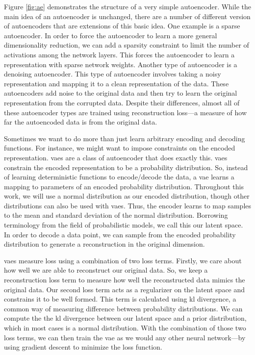 Figure \ref{fig:ae} demonstrates the structure of a very simple autoencoder.
While the main idea of an autoencoder is unchanged, there are a number of different version of autoencoders that are extensions of this basic idea.
One example is a sparse autoencoder.
In order to force the autoencoder to learn a more general dimensionality reduction, we can add a sparsity constraint to limit the number of activations among the network layers.
This forces the autoencoder to learn a representation with sparse network weights.
Another type of autoencoder is a denoising autoencoder.
This type of autoencoder involves taking a noisy representation and mapping it to a clean representation of the data.
These autoencoders add noise to the original data and then try to learn the original representation from the corrupted data.
Despite their differences, almost all of these autoencoder types are trained using reconstruction loss---a measure of how far the autoencoded data is from the original data.

Sometimes we want to do more than just learn arbitrary encoding and decoding functions.
For instance, we might want to impose constraints on the encoded representation.
\glspl{vae} are a class of autoencoder that does exactly this.
\glspl{vae} constrain the encoded representation to be a probability distribution.
So, instead of learning deterministic functions to encode/decode the data, a \gls{vae} learns a mapping to parameters of an encoded probability distribution.
Throughout this work, we will use a normal distribution as our encoded distribution, though other distributions can also be used with \glspl{vae}.
Thus, the encoder learns to map samples to the mean and standard deviation of the normal distribution.
Borrowing terminology from the field of probabilistic models, we call this our latent space.
In order to decode a data point, we can sample from the encoded probability distribution to generate a reconstruction in the original dimension.

\glspl{vae} measure loss using a combination of two loss terms.
Firstly, we care about how well we are able to reconstruct our original data.
So, we keep a reconstruction loss term to measure how well the reconstructed data mimics the original data.
Our second loss term acts as a regularizer on the latent space and constrains it to be well formed.
This term is calculated using \gls{kl} divergence, a common way of measuring difference between probability distributions.
We can compute the the \gls{kl} divergence between our latent space and a prior distribution, which in most cases is a normal distribution.
With the combination of those two loss terms, we can then train the \gls{vae} as we would any other neural network---by using gradient descent to minimize the loss function.

